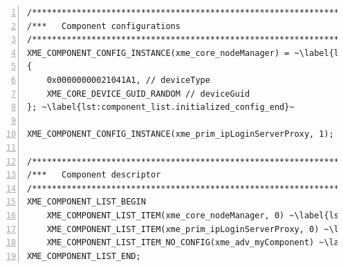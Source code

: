 \begin{lstlisting}[numbers=left,float=htpb,label=lst:component_list,caption=Sample component list with component configurations.]
/*****************************************************************************/
/***   Component configurations                                            ***/
/*****************************************************************************/
XME_COMPONENT_CONFIG_INSTANCE(xme_core_nodeManager) = ~\label{lst:component_list.initialized_config_begin}~
{
	0x00000000021041A1, // deviceType
	XME_CORE_DEVICE_GUID_RANDOM // deviceGuid
}; ~\label{lst:component_list.initialized_config_end}~

XME_COMPONENT_CONFIG_INSTANCE(xme_prim_ipLoginServerProxy, 1); ~\label{lst:component_list.uninitialized_config}~

/*****************************************************************************/
/***   Component descriptor                                                ***/
/*****************************************************************************/
XME_COMPONENT_LIST_BEGIN
	XME_COMPONENT_LIST_ITEM(xme_core_nodeManager, 0) ~\label{lst:component_list.stateful_1}~
	XME_COMPONENT_LIST_ITEM(xme_prim_ipLoginServerProxy, 0) ~\label{lst:component_list.stateful_2}~
	XME_COMPONENT_LIST_ITEM_NO_CONFIG(xme_adv_myComponent) ~\label{lst:component_list.stateless}~
XME_COMPONENT_LIST_END;
\end{lstlisting}

